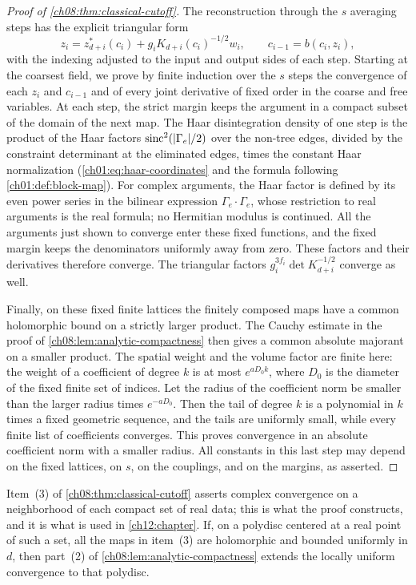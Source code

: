 \begin{proof}[Proof of \cref{ch08:thm:classical-cutoff}]
The reconstruction through the $s$ averaging steps has the explicit triangular form
\[
 z_i=z_{d+i}^*(c_i)+g_iK_{d+i}(c_i)^{-1/2}w_i,
 \qquad c_{i-1}=b(c_i,z_i),
\]
with the indexing adjusted to the input and output sides of each step. Starting at the coarsest field, we prove by finite induction over the $s$ steps the convergence of each $z_i$ and $c_{i-1}$ and of every joint derivative of fixed order in the coarse and free variables. At each step, the strict margin keeps the argument in a compact subset of the domain of the next map. The Haar disintegration density of one step is the product of the Haar factors $\operatorname{sinc}^2(|\Gamma_e|/2)$ over the non-tree edges, divided by the constraint determinant at the eliminated edges, times the constant Haar normalization (\cref{ch01:eq:haar-coordinates} and the formula following \cref{ch01:def:block-map}). For complex arguments, the Haar factor is defined by its even power series in the bilinear expression $\Gamma_e\cdot\Gamma_e$, whose restriction to real arguments is the real formula; no Hermitian modulus is continued. All the arguments just shown to converge enter these fixed functions, and the fixed margin keeps the denominators uniformly away from zero. These factors and their derivatives therefore converge. The triangular factors $g_i^{3f_i}\det K_{d+i}^{-1/2}$ converge as well.

Finally, on these fixed finite lattices the finitely composed maps have a common holomorphic bound on a strictly larger product. The Cauchy estimate in the proof of \cref{ch08:lem:analytic-compactness} then gives a common absolute majorant on a smaller product. The spatial weight and the volume factor are finite here: the weight of a coefficient of degree $k$ is at most $e^{aD_0k}$, where $D_0$ is the diameter of the fixed finite set of indices. Let the radius of the coefficient norm be smaller than the larger radius times $e^{-aD_0}$. Then the tail of degree $k$ is a polynomial in $k$ times a fixed geometric sequence, and the tails are uniformly small, while every finite list of coefficients converges. This proves convergence in an absolute coefficient norm with a smaller radius. All constants in this last step may depend on the fixed lattices, on $s$, on the couplings, and on the margins, as asserted.
\end{proof}

\begin{remark}\label{ch08:rem:complex-domain}
Item~(3) of \cref{ch08:thm:classical-cutoff} asserts complex convergence on a neighborhood of each compact set of real data; this is what the proof constructs, and it is what is used in \cref{ch12:chapter}. If, on a polydisc centered at a real point of such a set, all the maps in item~(3) are holomorphic and bounded uniformly in $d$, then part~(2) of \cref{ch08:lem:analytic-compactness} extends the locally uniform convergence to that polydisc.
\end{remark}

